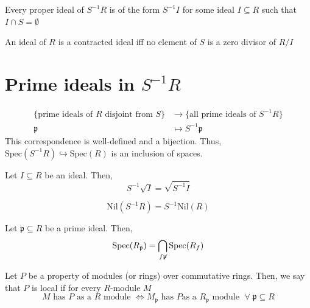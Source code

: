 \documentclass[oneside, 12pt]{scrbook}
\newcommand{\spec}{\mathrm{Spec}}
\newcommand{\pr}{\mathfrak{p}}
\newcommand{\nil}{\mathrm{Nil}}
\theoremstyle{theorem}
\begin{document}
\begin{corollary}
Every proper ideal of $S^{-1}R$ is of the form $S^{-1}I$ for some ideal $I \subseteq R$ such that $I \cap S = \emptyset$
\end{corollary}

\begin{exercise}
An ideal of $R$ is a contracted ideal iff no element of $S$ is a zero divisor of $R/I$
\end{exercise}

\section{Prime ideals in $S^{-1}R$}

\begin{proposition}
\begin{align*}
\{\text{prime ideals of }R \text{ disjoint from }S\} &\rightarrow \{\text{all prime ideals of }S^{-1}R\} \\
\pr &\longmapsto S^{-1}\pr
\end{align*}
This correspondence is well-defined and a bijection. Thus, $\spec(S^{-1}R) \hookrightarrow \spec(R)$ is an inclusion of spaces.
\end{proposition}

\begin{exercise}
Let $I \subseteq R$ be an ideal. Then, $$S^{-1}\sqrt{I} = \sqrt{S^{-1}I}$$ 
\end{exercise}


\begin{corollary}
\begin{equation}
\nil(S^{-1}R) = S^{-1} \nil(R)
\end{equation}
\end{corollary}

\begin{proposition}
Let $\pr \subseteq R$ be a prime ideal. Then, \begin{equation}
\spec(R_{\pr}) = \bigcap_{f \not \pr} \spec(R_{f})
\end{equation}
\end{proposition}

Let $P$ be a property of modules (or rings) over commutative rings. Then, we say that $P$ is local if for every $R$-module $M$ 
\begin{equation}
M \text{ has } P \text{ as a } R \text{ module } \Leftrightarrow M_{\pr} \text{ has } P \text{as a } R_{\pr} \text{ module } \; \forall \; \pr \subseteq R
\end{equation} 
\end{document}
